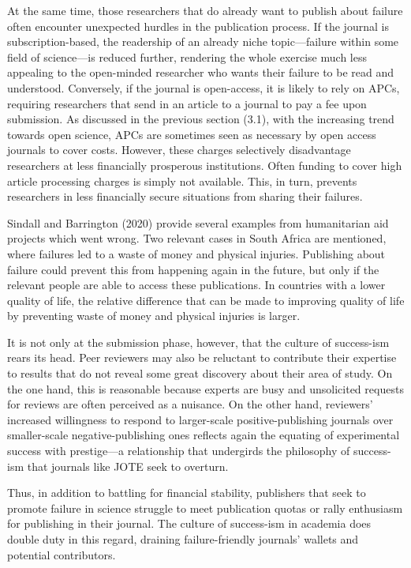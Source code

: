 \documentclass[empirical, author-date]{jote-article}
\begin{document}
At the same time, those researchers that do already want to publish about failure often encounter unexpected hurdles in the publication process. If the journal is subscription-based, the readership of an already niche topic—failure within some field of science—is reduced further, rendering the whole exercise much less appealing to the open-minded researcher who wants their failure to be read and understood. Conversely, if the journal is open-access, it is likely to rely on APCs, requiring researchers that send in an article to a journal to pay a fee upon submission. As discussed in the previous section (3.1), with the increasing trend towards open science, APCs are sometimes seen as necessary by open access journals to cover costs. However, these charges selectively disadvantage researchers at less financially prosperous institutions. Often funding to cover high article processing charges is simply not available. This, in turn, prevents researchers in less financially secure situations from sharing their failures.

Sindall and Barrington (2020) provide several examples from humanitarian aid projects which went wrong. Two relevant cases in South Africa are mentioned, where failures led to a waste of money and physical injuries. Publishing about failure could prevent this from happening again in the future, but only if the relevant people are able to access these publications. In countries with a lower quality of life, the relative difference that can be made to improving quality of life by preventing waste of money and physical injuries is larger. 

It is not only at the submission phase, however, that the culture of success-ism rears its head. Peer reviewers may also be reluctant to contribute their expertise to results that do not reveal some great discovery about their area of study. On the one hand, this is reasonable because experts are busy and unsolicited requests for reviews are often perceived as a nuisance. On the other hand, reviewers' increased willingness to respond to larger-scale positive-publishing journals over smaller-scale negative-publishing ones reflects again the equating of experimental success with prestige—a relationship that undergirds the philosophy of success-ism that journals like JOTE seek to overturn. 

Thus, in addition to battling for financial stability, publishers that seek to promote failure in science struggle to meet publication quotas or rally enthusiasm for publishing in their journal. The culture of success-ism in academia does double duty in this regard, draining failure-friendly journals' wallets and potential contributors.
\end{document}
